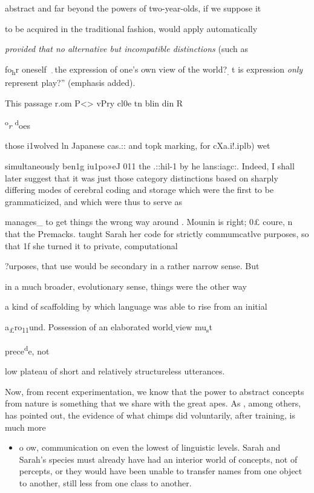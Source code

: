 abstract and far beyond the powers of two-year-olds, if we suppose it

to be acquired in the traditional fashion, would apply automatically

\textit{provided that no alternative but incompatible distinctions }(such as

fo\textsubscript{h}\textsubscript{{\textquotedbl}}r oneself \textsubscript{·}the expression of one's own view of the world?\textsubscript{. }t is expression \textit{only} represent play?'' (emphasis added).

This passage r.om P{\textless}{\textgreater} vPry cl0e tn blin din R

\textsuperscript{o}\textit{r} \textsuperscript{d}oes

those i1wolved ln Japanese cas.:: and topk marking, for cXa.i!.iplb) wet

simultaneously ben1g iu1po»eJ 011 the .::hil-1 by he lans:iagc:. Indeed, I shall later suggest that it was just those category distinctions based on sharply differing modes of cerebral coding and storage which were the first to be grammaticized, and which were thus to serve as

manages\_ to get things the wrong way around . Mounin is right; 0£ coure, n that the Premacks. taught Sarah her code for strictly com\-mumcatlve purposes, so that 1f she turned it to private, computational

?urposes, that use would be secondary in a rather narrow sense. But

in a much broader, evolutionary sense, things were the other way

a kind of scaffolding by which language was able to rise from an initial

a\textsubscript{£}ro\textsubscript{1}\textsubscript{1}und. Possession of an elaborated world\textsubscript{{}-}view mu\textsubscript{s}t

prece\textsuperscript{d}e, not

low plateau of short and relatively structureless utterances.

Now, from recent experimentation, we know that the power to abstract concepts from nature is something that we share with the great apes. As \citet{Mounin1976}, among others, has pointed out, the evidence of what chimps did voluntarily, after training, is much more

\begin{itemize}
\item o ow, communication on even the lowest of linguistic levels. Sarah and Sarah's species must already have had an interior world of con\-cepts, not of percepts, or they would have been unable to transfer names from one object to another, still less from one class to another.
\end{itemize}

